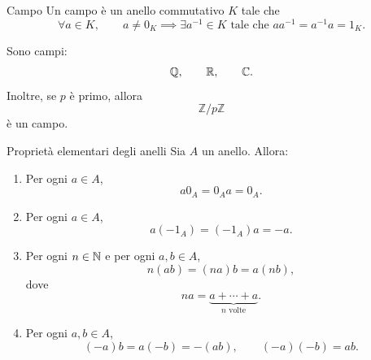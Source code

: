 \documentclass[a4paper]{article}
\begin{document}
\begin{radioactive}
\begin{snippetdefinition}{Campo}
    Un campo è un anello commutativo \(K\) tale che
    \[
        \forall a \in K,
        \qquad
        a \neq 0_K
        \implies
        \exists a^{-1} \in K
        \text{ tale che }
        aa^{-1}=a^{-1}a=1_K.
    \]
\end{snippetdefinition}
\end{radioactive}

\begin{radioactive}
\begin{snippetexample}{}
    Sono campi:
    \[
        \mathbb{Q},
        \qquad
        \mathbb{R},
        \qquad
        \mathbb{C}.
    \]
    Inoltre, se \(p\) è primo, allora
    \[
        \mathbb{Z}/p\mathbb{Z}
    \]
    è un campo.
\end{snippetexample}
\end{radioactive}

\begin{radioactive}
\begin{snippetproposition}{Proprietà elementari degli anelli}
    Sia \(A\) un anello. Allora:

    \begin{enumerate}
        \item Per ogni \(a \in A\),
        \[
            a0_A=0_Aa=0_A.
        \]

        \item Per ogni \(a \in A\),
        \[
            a(-1_A)=(-1_A)a=-a.
        \]

        \item Per ogni \(n \in \mathbb{N}\) e per ogni \(a,b \in A\),
        \[
            n(ab)=(na)b=a(nb),
        \]
        dove
        \[
            na=
            \underbrace{a+\cdots+a}_{n \text{ volte}}.
        \]

        \item Per ogni \(a,b \in A\),
        \[
            (-a)b=a(-b)=-(ab),
            \qquad
            (-a)(-b)=ab.
        \]
    \end{enumerate}
\end{snippetproposition}
\end{radioactive}
\end{document}
